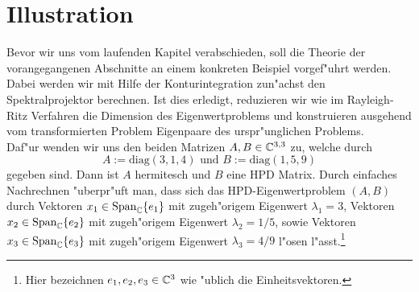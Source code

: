 \section{Illustration}\label{sec:bsp}

Bevor wir uns vom laufenden Kapitel verabschieden, soll die Theorie der vorangegangenen Abschnitte an einem konkreten Beispiel vorgef"uhrt werden. Dabei werden wir mit Hilfe der Konturintegration zun"achst den Spektralprojektor berechnen. Ist dies erledigt, reduzieren wir wie im Rayleigh-Ritz Verfahren die Dimension des Eigenwertproblems und konstruieren ausgehend vom transformierten Problem Eigenpaare des urspr"unglichen Problems.\\

Daf"ur wenden wir uns den beiden Matrizen
$A,B \in \mathbb{C}^{3,3}$ zu, welche durch
\[
A:= \text{diag}(3,1,4)\text{ und }
B:= \text{diag}(1,5,9)
\]
gegeben sind. Dann ist $A$ hermitesch und $B$ eine HPD Matrix.
Durch einfaches Nachrechnen "uberpr"uft man, dass sich das
HPD-Eigenwertproblem $(A,B)$ durch Vektoren
$x_1 \in \text{Span}_{\mathbb{C}}\{e_1\}$ mit zugeh"origem Eigenwert $\lambda_1 = 3$, Vektoren
$x_2 \in \text{Span}_{\mathbb{C}}\{e_2\}$ mit zugeh"origem Eigenwert $\lambda_2 = 1/5$, sowie
Vektoren $x_3 \in\text{Span}_{\mathbb{C}}\{e_3\}$ mit zugeh"origem Eigenwert $\lambda_3 = 4/9$
l"osen l"asst.\footnote{Hier bezeichnen $e_1, e_2, e_3 \in\mathbb{C}^3$ wie "ublich die Einheitsvektoren.}\\

